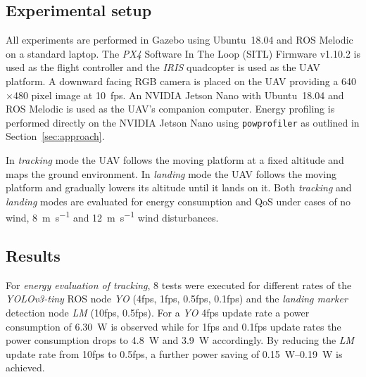 \documentclass[conference]{IEEEtran}
\newcommand{\stt}[1]{{\small\tt #1}} %
\newcommand{\powprof}{\stt{powprofiler}}
\begin{document}
\subsection{Experimental setup}

All experiments are performed in Gazebo %
using Ubuntu~18.04 and ROS Melodic on a standard
laptop. The \emph{PX4} Software In The Loop (SITL) Firmware v1.10.2 is used as the flight
controller and the \emph{IRIS} quadcopter is used as the UAV platform. A
downward facing RGB camera is placed on the UAV providing a
\SI{640}{}$\times$\SI{480}{} pixel image at 10~fps. An NVIDIA Jetson Nano
with Ubuntu~18.04 and ROS Melodic is used as the UAV's companion
computer. 
%
Energy profiling is performed directly on the NVIDIA Jetson
  Nano using \powprof{} as outlined in Section~\ref{sec:approach}.
  
%
%
In \emph{tracking} mode the UAV follows the moving platform at a fixed
altitude and maps the ground environment.
In \emph{landing} mode the UAV follows the moving platform and
gradually lowers its altitude until it lands on it. Both \emph{tracking} and
\emph{landing} modes are evaluated for energy consumption and QoS under cases of no wind, \SI{8}{\meter \per \second} and \SI{12}{\meter \per \second} wind disturbances. %


\subsection{Results}

For \emph{energy 
evaluation of tracking}, 8 tests were executed for different rates 
of the \emph{YOLOv3-tiny} ROS node \emph{YO} (4fps, 1fps, 0.5fps, 0.1fps) and 
the \emph{landing marker} detection node \emph{LM} (10fps, 0.5fps).
%
For a \emph{YO} 4fps update rate
a power consumption of \SI{6.30}{\watt} is observed while
for 1fps and 0.1fps update rates the power consumption drops to
\SI{4,8}{\watt} and \SI{3.9}{\watt} accordingly. By reducing the \emph{LM} update rate
from 10fps to 0.5fps, a further power
saving of \SI{0.15}{\watt}--\SI{0.19}{\watt} is achieved.
\end{document}
